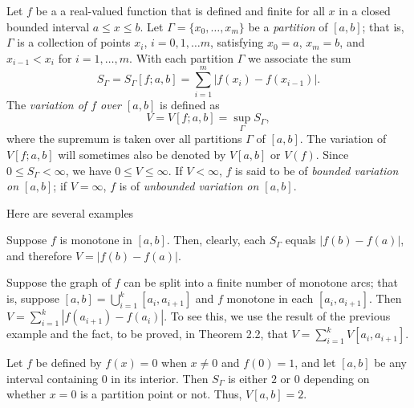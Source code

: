 Let $f$ be a a real-valued function that is defined and finite for all $x$
in a closed bounded interval $a\leq x\leq b$. Let
$\Gamma=\{x_0,\dotsc,x_m\}$ be a \emph{partition} of $[a,b]$; that is,
$\Gamma$ is a collection of points $x_i$, $i=0,1,\dots m$, satisfying
$x_0=a$, $x_m=b$, and $x_{i-1}<x_i$ for $i=1,\dotsc,m$. With each partition
$\Gamma$ we associate the sum
\begin{equation}
\label{eq:variation-sums}
S_\Gamma=S_\Gamma[f;a,b]=\sum_{i=1}^m|f(x_i)-f(x_{i-1})|.
\end{equation}
The \emph{variation of $f$ over $[a,b]$} is defined as
\begin{equation}
\label{eq:variation}
V=V[f;a,b]=\sup_\Gamma S_\Gamma,
\end{equation}
where the supremum is taken over all partitions $\Gamma$ of $[a,b]$. The
variation of $V[f;a,b]$ will sometimes also be denoted by $V[a,b]$ or
$V(f)$. Since $0\leq S_\Gamma<\infty$, we have $0\leq V\leq\infty$. If
$V<\infty$, $f$ is said to be of \emph{bounded variation on $[a,b]$}; if
$V=\infty$, $f$ is of \emph{unbounded variation on $[a,b]$}.

Here are several examples
\begin{example}
Suppose $f$ is monotone in $[a,b]$. Then, clearly, each $S_\Gamma$ equals
$|f(b)-f(a)|$, and therefore $V=|f(b)-f(a)|$.
\end{example}
\begin{example}
Suppose the graph of $f$ can be split into a finite number of monotone
arcs; that is, suppose $[a,b]=\bigcup_{i=1}^k[a_i,a_{i+1}]$ and $f$
monotone in each $[a_i,a_{i+1}]$. Then
$V=\sum_{i=1}^k|f(a_{i+1})-f(a_i)|$. To see this, we use the result of the
previous example and the fact, to be proved, in Theorem 2.2, that
$V=\sum_{i=1}^kV[a_i,a_{i+1}]$.
\end{example}
\begin{example}
Let $f$ be defined by $f(x)= 0$ when $x\neq 0$ and $f(0)=
1$, and let $[a,b]$ be any interval containing $0$ in its interior. Then
$S_\Gamma$ is either $2$ or $0$ depending on whether $x=0$ is a partition
point or not. Thus, $V[a,b]=2$.
\end{example}

